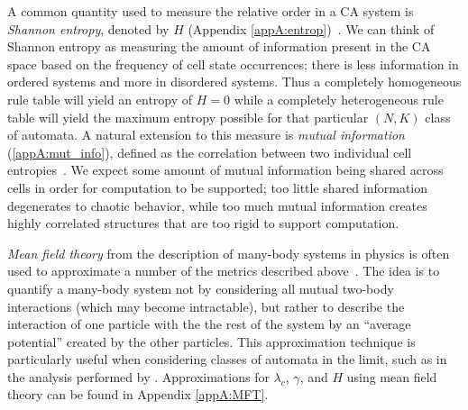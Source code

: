 \documentclass[a4paper,11pt]{report}
\begin{document}
\medskip

A common quantity used to measure the relative order in a CA system is \textit{Shannon entropy}, denoted by $H$ (Appendix \ref{appA:entrop})~\cite{la90,li90a,wo90}. We can think of Shannon entropy as measuring the amount of information present in the CA space based on the frequency of cell state occurrences; there is less information in ordered systems and more in disordered systems. Thus a completely homogeneous rule table will yield an entropy of $H = 0$ while a completely heterogeneous rule table will yield the maximum entropy possible for that particular $(N,K)$ class of automata. A natural extension to this measure is \textit{mutual information} (\ref{appA:mut_info}), defined as the correlation between two individual cell entropies~\cite{la90}. We expect some amount of mutual information being shared across cells in order for computation to be supported; too little shared information degenerates to chaotic behavior, while too much mutual information creates highly correlated structures that are too rigid to support computation.

\medskip

\textit{Mean field theory} from the description of many-body systems in physics is often used to approximate a number of the metrics described above~\cite{li90b,wo90}. The idea is to quantify a many-body system not by considering all mutual two-body interactions (which may become intractable), but rather to describe the interaction of one particle with the the rest of the system by an ``average potential'' created by the other particles. This approximation technique is particularly useful when considering classes of automata in the limit, such as in the analysis performed by \citeauthor{wo90}. Approximations for $\lambda_c$, $\gamma$, and $H$ using mean field theory can be found in Appendix \ref{appA:MFT}.




\end{document}
